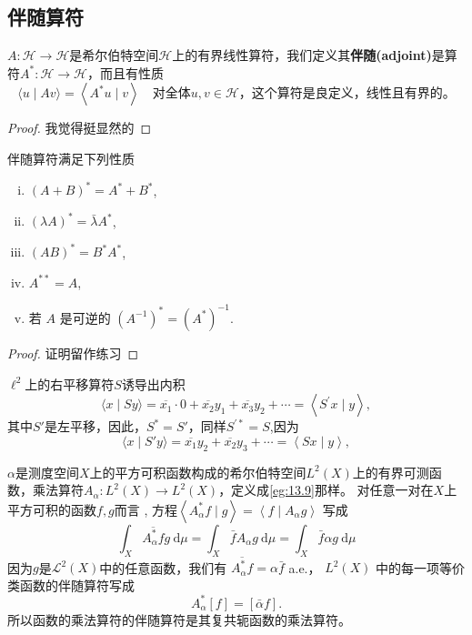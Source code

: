 \subsection{伴随算符}
\(A:\mathcal{H}\rightarrow\mathcal{H}\)是希尔伯特空间\(\mathcal{H}\)上的有界线性算符，我们定义其\textbf{伴随(adjoint)}是算符\(A^*:\mathcal{H}\rightarrow\mathcal{H}\)，而且有性质
\begin{equation}
    \langle u \mid A v\rangle=\left\langle A^{*} u \mid v\right\rangle \quad \text{对全体} u, v \in \mathcal{H}，这个算符是良定义，线性且有界的。
\end{equation}
\begin{proof}
    我觉得挺显然的
\end{proof}
\begin{theorem}
    伴随算符满足下列性质
    \begin{enumerate}[(i).]
        \item $(A+B)^{*}=A^{*}+B^{*}$,
        \item $(\lambda A)^{*}=\bar{\lambda} A^{*}$,
        \item $(A B)^{*}=B^{*} A^{*}$,
        \item $A^{* *}=A$,
        \item 若 $A$ 是可逆的 $\left(A^{-1}\right)^{*}=\left(A^{*}\right)^{-1}$.
    \end{enumerate}
\end{theorem}
\begin{proof}
    证明留作练习
\end{proof}
\begin{eg}
    \(\ell^2\)上的右平移算符\(S\)诱导出内积
$$
\langle x \mid S y\rangle=\overline{x_{1}} \cdot 0+\overline{x_{2}} y_{1}+\overline{x_{3}} y_{2}+\cdots=\left\langle S^{\prime} x \mid y\right\rangle,
$$
其中\(S'\)是左平移，因此，\(S^{*}=S'\)，同样\(S^{'*}=S\),因为
$$
\langle x \mid S' y\rangle=\overline{x_{1}} y_2+\overline{x_{2}} y_{3}+\cdots=\left\langle S x \mid y\right\rangle,
$$
\end{eg}
\begin{eg}
    \(\alpha\)是测度空间\(X\)上的平方可积函数构成的希尔伯特空间\(L^2(X)\)上的有界可测函数，乘法算符\(A_\alpha:L^2(X)\rightarrow L^2(X)\)，定义成\ref{eg:13.9}那样。 对任意一对在$X$上平方可积的函数$f, g$而言 , 方程$\left\langle A_{\alpha}^{*} f \mid g\right\rangle=\left\langle f \mid A_{\alpha} g\right\rangle$ 写成
$$
\int_{X} \overline{A_{\alpha}^{*} f} g \mathrm{~d} \mu=\int_{X} \bar{f} A_{\alpha} g \mathrm{~d} \mu=\int_{X} \bar{f} \alpha g \mathrm{~d} \mu
$$
因为$g$是$\mathcal{L}^{2}(X)$中的任意函数，我们有 $\overline{A_{\alpha}^{*} f}=\alpha \bar{f}$ a.e.， $L^{2}(X)$ 中的每一项等价类函数的伴随算符写成
$$
A_{\alpha}^{*}[f]=[\bar{\alpha} f] .
$$
所以函数的乘法算符的伴随算符是其复共轭函数的乘法算符。
\end{eg}
